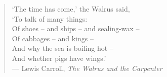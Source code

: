 \cleardoublepage\thispagestyle{empty}\vspace*{4\baselineskip}
    
	\hbox{}\hfill\noindent\parbox{10.1225cm}{\begin{verse}
    \setlength{}
	\begin{altverse}
      `The time has come,' the Walrus said,\\ 
        `To talk of many things:\\
      Of shoes -- and ships -- and sealing-wax --\\
        Of cabbages -- and kings --\\
      And why the sea is boiling hot --\\
        And whether pigs have wings.'\\[\baselineskip]
\vin\vin --- Lewis Carroll, \emph{The Walrus and the Carpenter}        
    \end{altverse}
    \end{verse}}
	\vspace*{\fill}
	\cleardoublepage
